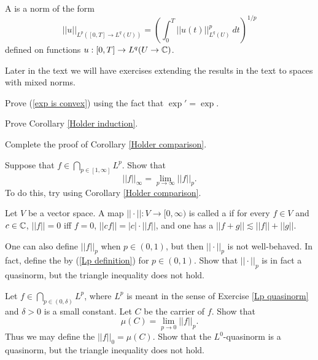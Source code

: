 \begin{definition}
A  is a norm of the form
$$||u||_{L^p([0, T] \to L^q(U))} = \left(\int_0^T ||u(t)||_{L^q(U)}^p~dt\right)^{1/p}$$
defined on functions $u: [0, T] \to L^q(U \to \mathbb{C})$.
\end{definition}

Later in the text we will have exercises extending the results in the text to spaces with mixed norms.

\begin{exercise}
\label{exp is convex exer}
Prove (\ref{exp is convex}) using the fact that $\exp' = \exp$.
\end{exercise}

\begin{exercise}
\label{Holder induction exer}
Prove Corollary \ref{Holder induction}.
\end{exercise}

\begin{exercise}
\label{granular comparison}
Complete the proof of Corollary \ref{Holder comparison}.
\end{exercise}

\begin{exercise}
Suppose that $f \in \bigcap_{p \in [1, \infty]} L^p$. Show that
$$||f||_\infty = \lim_{p \to \infty} ||f||_p.$$
To do this, try using Corollary \ref{Holder comparison}.
\end{exercise}

\begin{definition}
Let $V$ be a vector space.
A map $||\cdot||: V \to [0, \infty)$ is called a  if for every $f \in V$ and $c \in \mathbb{C}$, $||f|| = 0$ iff $f = 0$, $||cf|| = |c|\cdot||f||$, and one has a  $||f + g|| \lesssim ||f|| + ||g||$.
\end{definition}

\begin{exercise}
\label{Lp quasinorm}
One can also define $||f||_p$ when $p \in (0, 1)$, but then $||\cdot||_p$ is not well-behaved.
In fact, define the  by (\ref{Lp definition}) for $p \in (0, 1)$.
Show that $||\cdot||_p$ is in fact a quasinorm, but the triangle inequality does not hold.
\end{exercise}

\begin{exercise}
Let $f \in \bigcap_{p \in (0, \delta)} L^p$, where $L^p$ is meant in the sense of Exercise \ref{Lp quasinorm} and $\delta > 0$ is a small constant.
Let $C$ be the carrier of $f$. Show that
$$\mu(C) = \lim_{p \to 0} ||f||_p.$$
Thus we may define the  $||f||_0 = \mu(C)$.
Show that the $L^0$-quasinorm is a quasinorm, but the triangle inequality does not hold.
\end{exercise}

